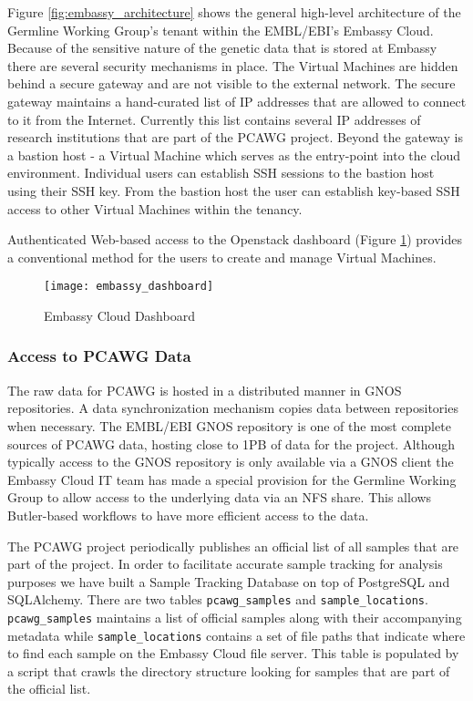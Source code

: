 Figure \ref{fig:embassy_architecture} shows the general high-level architecture of the Germline Working Group's tenant within the EMBL/EBI's Embassy Cloud. Because of the sensitive nature of the genetic data that is stored at Embassy there are several security mechanisms in place. The Virtual Machines are hidden behind a secure gateway and are not visible to the external network. The secure gateway maintains a hand-curated list of IP addresses that are allowed to connect to it from the Internet. Currently this list contains several IP addresses of research institutions that are part of the PCAWG project. Beyond the gateway is a bastion host - a Virtual Machine which serves as the entry-point into the cloud environment. Individual users can establish SSH sessions to the bastion host using their SSH key. From the bastion host the user can establish key-based SSH access to other Virtual Machines within the tenancy. 

Authenticated Web-based access to the Openstack dashboard (Figure \ref{fig:embassy_dashboard}) provides a conventional method for the users to create and manage Virtual Machines.

\begin{figure}[H]
\texttt{[image: embassy\_dashboard]}
\centering
\caption {Embassy Cloud Dashboard}
\label{fig:embassy_dashboard}
\end{figure}

\subsubsection{Access to PCAWG Data}
\label{sec:pcawg_data_access}

The raw data for PCAWG is hosted in a distributed manner in GNOS repositories. A data synchronization mechanism copies data between repositories when necessary. The EMBL/EBI GNOS repository is one of the most complete sources of PCAWG data, hosting close to 1PB of data for the project. Although typically access to the GNOS repository is only available via a GNOS client the Embassy Cloud IT team has made a special provision for the Germline Working Group to allow access to the underlying data via an NFS share. This allows Butler-based workflows to have more efficient access to the data.

The PCAWG project periodically publishes an official list of all samples that are part of the project. In order to facilitate accurate sample tracking for analysis purposes we have built a Sample Tracking Database on top of PostgreSQL and SQLAlchemy. There are two tables \texttt{pcawg_samples} and \texttt{sample_locations}. \texttt{pcawg_samples} maintains a list of official samples along with their accompanying metadata while \texttt{sample_locations} contains a set of file paths that indicate where to find each sample on the Embassy Cloud file server. This table is populated by a script that crawls the directory structure looking for samples that are part of the official list.


